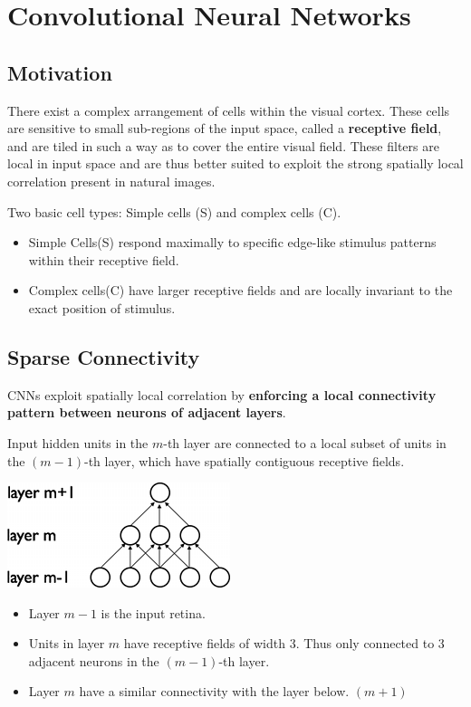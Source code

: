 \chapter{Convolutional Neural Networks}
\section{Motivation}
There exist a complex arrangement of cells within the visual cortex. These
cells are sensitive to small sub-regions of the input space, called a
\textbf{receptive field}, and are tiled in such a way as to cover the
entire visual field. These filters are local in input space and are thus
better suited to exploit the strong spatially local correlation present in
natural images.

Two basic cell types: Simple cells (S) and complex cells (C).
\begin{itemize}
    \item Simple Cells(S) respond maximally to specific edge-like stimulus
        patterns within their receptive field.
    \item Complex cells(C) have larger receptive fields and are locally
        invariant to the exact position of stimulus.
\end{itemize}

\section{Sparse Connectivity}
CNNs exploit spatially local correlation by \textbf{enforcing a local
connectivity pattern between neurons of adjacent layers}. 

Input hidden units in the $m$-th layer are connected to a local subset of
units in the $(m-1)$-th layer, which have spatially contiguous receptive
fields. 

\includegraphics{sparse_1D_cnn}

\begin{itemize}
    \item Layer $m-1$ is the input retina. 
    \item Units in layer $m$ have receptive fields of width 3. Thus only
        connected to 3 adjacent neurons in the $(m-1)$-th layer.
    \item Layer $m$ have a similar connectivity with the layer below.
        $(m+1)$
\end{itemize}

